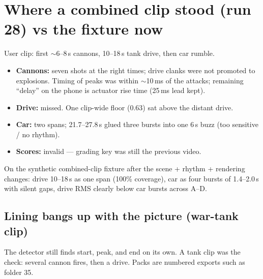 \documentclass[11pt,a4paper]{article}
\begin{document}
\section{Where a combined clip stood (run 28) vs the fixture now}
User clip: first $\sim$6--8\,s cannons, 10--18\,s tank drive, then car rumble.

\begin{itemize}[leftmargin=*,itemsep=2pt]
  \item \textbf{Cannons:} seven shots at the right times; drive clanks were not promoted to explosions. Timing of peaks was within $\sim$10\,ms of the attacks; remaining ``delay'' on the phone is actuator rise time (25\,ms lead kept).
  \item \textbf{Drive:} missed. One clip-wide floor (0.63) sat above the distant drive.
  \item \textbf{Car:} two spans; 21.7--27.8\,s glued three bursts into one 6\,s buzz (too sensitive / no rhythm).
  \item \textbf{Scores:} invalid --- grading key was still the previous video.
\end{itemize}

On the synthetic combined-clip fixture after the scene + rhythm + rendering changes: drive 10--18\,s as one span (100\% coverage), car as four bursts of 1.4--2.0\,s with silent gaps, drive RMS clearly below car bursts across A--D.

\subsection*{Lining bangs up with the picture (war-tank clip)}
The detector still finds start, peak, and end on its own. A tank clip was the check: several cannon fires, then a drive. Packs are numbered exports such as folder 35.
\end{document}
